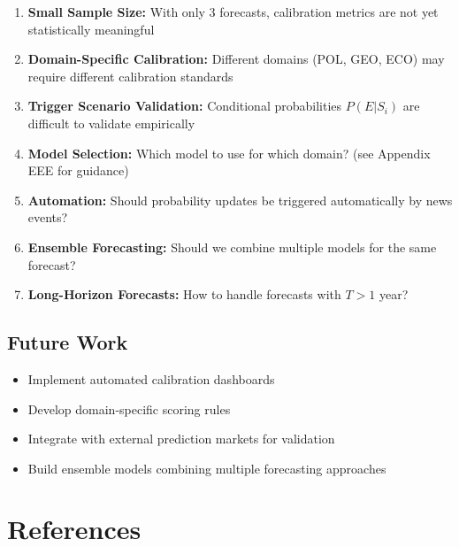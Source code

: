 \begin{enumerate}
    \item \textbf{Small Sample Size:} With only 3 forecasts, calibration metrics are not yet statistically meaningful

    \item \textbf{Domain-Specific Calibration:} Different domains (POL, GEO, ECO) may require different calibration standards

    \item \textbf{Trigger Scenario Validation:} Conditional probabilities $P(E|S_i)$ are difficult to validate empirically

    \item \textbf{Model Selection:} Which model to use for which domain? (see Appendix EEE for guidance)

    \item \textbf{Automation:} Should probability updates be triggered automatically by news events?

    \item \textbf{Ensemble Forecasting:} Should we combine multiple models for the same forecast?

    \item \textbf{Long-Horizon Forecasts:} How to handle forecasts with $T > 1$ year?
\end{enumerate}

\subsection{Future Work}

\begin{itemize}
    \item Implement automated calibration dashboards
    \item Develop domain-specific scoring rules
    \item Integrate with external prediction markets for validation
    \item Build ensemble models combining multiple forecasting approaches
\end{itemize}

\section{References}
\label{sec:fct-references}

